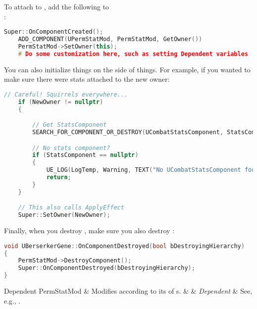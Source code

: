To attach  to , add the following to\\:
\begin{lstlisting}[language=c++]
	Super::OnComponentCreated();
	ADD_COMPONENT(UPermStatMod, PermStatMod, GetOwner())
	PermStatMod->SetOwner(this);
	# Do some customization here, such as setting Dependent variables
\end{lstlisting}
You can also initialize things on the  side of things. For example, if you wanted to make sure there were stats attached to the new owner:
\begin{lstlisting}[language=c++]
	// Careful! Squirrels everywhere...
	if (NewOwner != nullptr)
	{

		// Get StatsComponent
		SEARCH_FOR_COMPONENT_OR_DESTROY(UCombatStatsComponent, StatsComponent, NewOwner->GetOwner(), true)

		// No stats component?
		if (StatsComponent == nullptr)
		{
			UE_LOG(LogTemp, Warning, TEXT("No UCombatStatsComponent found for PermStatMod! This is required *before* the Owner is set."))
			return;
		}
	}

	// This also calls ApplyEffect
	Super::SetOwner(NewOwner);
\end{lstlisting}
Finally, when you destroy , make sure you also destroy :
\begin{lstlisting}[language=C++]
void UBerserkerGene::OnComponentDestroyed(bool bDestroyingHierarchy)
{
	PermStatMod->DestroyComponent();
	Super::OnComponentDestroyed(bDestroyingHierarchy);
}
\end{lstlisting}

\begin{EffectTable}{Dependent}
	PermStatMod	& {Modifies according to its  of s.}	&  & \textit{Dependent} & See, e.g., .\\
\end{EffectTable}


\postamble{}